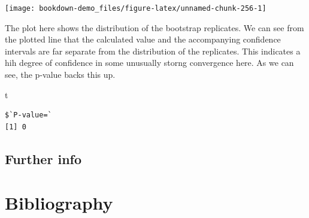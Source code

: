 \documentclass[
]{book}
\newenvironment{Shaded}{\begin{snugshade}}{\end{snugshade}}
\newcommand{\NormalTok}[1]{#1}
\begin{document}
\begin{center}\texttt{[image: bookdown-demo\_files/figure-latex/unnamed-chunk-256-1]} \end{center}

The plot here shows the distribution of the bootstrap replicates. We can see from the plotted line that the calculated value and the accompanying confidence intervals are far separate from the distribution of the replicates. This indicates a hih degree of confidence in some unusually storng convergence here. As we can see, the p-value backs this up.

\begin{Shaded}
\begin{Highlighting}[]
\NormalTok{t}
\end{Highlighting}
\end{Shaded}

\begin{verbatim}
$`P-value=`
[1] 0
\end{verbatim}

\hypertarget{further-info-5}{%
\section{Further info}\label{further-info-5}}

\hypertarget{bibliography}{%
\chapter{Bibliography}\label{bibliography}}

  
\end{document}
